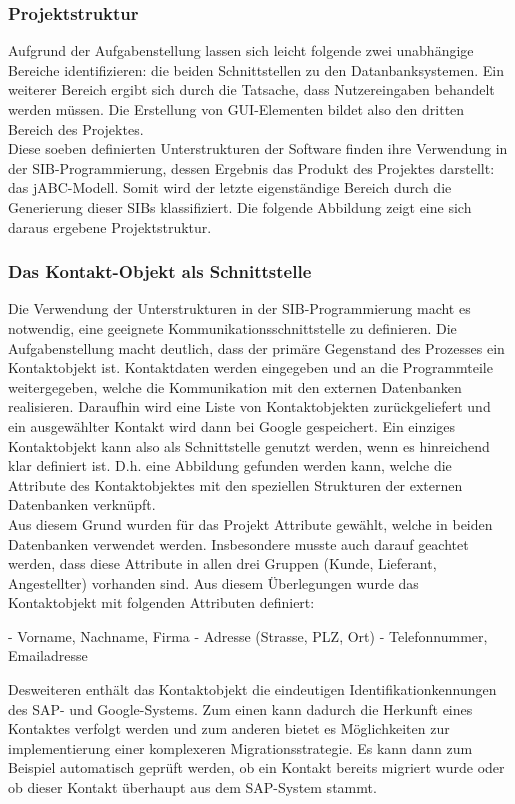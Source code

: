 \subsubsection{Projektstruktur}
Aufgrund der Aufgabenstellung lassen sich leicht folgende zwei unabhängige Bereiche identifizieren: die beiden Schnittstellen zu den Datanbanksystemen. Ein weiterer Bereich ergibt sich durch die Tatsache, dass Nutzereingaben behandelt werden müssen. Die Erstellung von GUI-Elementen bildet also den dritten Bereich des Projektes.\\
Diese soeben definierten Unterstrukturen der Software finden ihre Verwendung in der SIB-Programmierung, dessen Ergebnis das Produkt des Projektes darstellt: das jABC-Modell. Somit wird der letzte eigenständige Bereich durch die Generierung dieser SIBs klassifiziert. Die folgende Abbildung zeigt eine sich daraus ergebene Projektstruktur.\\
	
\subsubsection{Das Kontakt-Objekt als Schnittstelle}
Die Verwendung der Unterstrukturen in der SIB-Programmierung macht es notwendig, eine geeignete Kommunikationsschnittstelle zu definieren. Die Aufgabenstellung macht deutlich, dass der primäre Gegenstand des Prozesses ein Kontaktobjekt ist. Kontaktdaten werden eingegeben und an die Programmteile weitergegeben, welche die Kommunikation mit den externen Datenbanken realisieren. Daraufhin wird eine Liste von Kontaktobjekten zurückgeliefert und ein ausgewählter Kontakt wird dann bei Google gespeichert. Ein einziges Kontaktobjekt kann also als Schnittstelle genutzt werden, wenn es hinreichend klar definiert ist. D.h. eine Abbildung gefunden werden kann, welche die Attribute des Kontaktobjektes mit den speziellen Strukturen der externen Datenbanken verknüpft.\\
Aus diesem Grund wurden für das Projekt Attribute gewählt, welche in beiden Datenbanken verwendet werden. Insbesondere musste auch darauf geachtet werden, dass diese Attribute in allen drei Gruppen (Kunde, Lieferant, Angestellter) vorhanden sind. Aus diesem Überlegungen wurde das Kontaktobjekt mit folgenden Attributen definiert:

- Vorname, Nachname, Firma
- Adresse (Strasse, PLZ, Ort)
- Telefonnummer, Emailadresse

Desweiteren enthält das Kontaktobjekt die eindeutigen Identifikationkennungen des SAP- und Google-Systems. Zum einen kann dadurch die Herkunft eines Kontaktes verfolgt werden und zum anderen bietet es Möglichkeiten zur implementierung einer komplexeren Migrationsstrategie. Es kann dann zum Beispiel automatisch geprüft werden, ob ein Kontakt bereits migriert wurde oder ob dieser Kontakt überhaupt aus dem SAP-System stammt.
	
